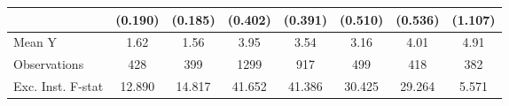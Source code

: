 {\begin{tabular}{l*{7}{c}}
            &     (0.190)         &     (0.185)         &     (0.402)         &     (0.391)         &     (0.510)         &     (0.536)         &     (1.107)         \\
\midrule
Mean Y      &        1.62         &        1.56         &        3.95         &        3.54         &        3.16         &        4.01         &        4.91         \\
Observations&         428         &         399         &        1299         &         917         &         499         &         418         &         382         \\
Exc. Inst. F-stat&      12.890         &      14.817         &      41.652         &      41.386         &      30.425         &      29.264         &       5.571         \\
\bottomrule
\end{tabular}
}
